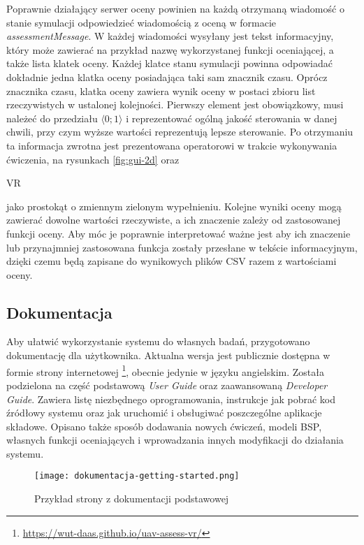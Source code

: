 Poprawnie działający serwer oceny powinien na każdą otrzymaną wiadomość o stanie symulacji odpowiedzieć wiadomością z oceną w formacie \emph{assessmentMessage}. W każdej wiadomości wysyłany jest tekst informacyjny, który może zawierać na przykład nazwę wykorzystanej funkcji oceniającej, a także lista klatek oceny. Każdej klatce stanu symulacji powinna odpowiadać dokładnie jedna klatka oceny posiadająca taki sam znacznik czasu. Oprócz znacznika czasu, klatka oceny zawiera wynik oceny w postaci zbioru list rzeczywistych w ustalonej kolejności. Pierwszy element jest obowiązkowy, musi należeć do przedziału $ \langle 0; 1 \rangle $ i reprezentować ogólną jakość sterowania w danej chwili, przy czym wyższe wartości reprezentują lepsze sterowanie. Po otrzymaniu ta informacja zwrotna jest prezentowana operatorowi w trakcie wykonywania ćwiczenia, na rysunkach \ref{fig:gui-2d} oraz \begin{todo}VR\end{todo} jako prostokąt o zmiennym zielonym wypełnieniu. Kolejne wyniki oceny mogą zawierać dowolne wartości rzeczywiste, a ich znaczenie zależy od zastosowanej funkcji oceny. Aby móc je poprawnie interpretować ważne jest aby ich znaczenie lub przynajmniej zastosowana funkcja zostały przesłane w tekście informacyjnym, dzięki czemu będą zapisane do wynikowych plików CSV razem z wartościami oceny.

\subsection{Dokumentacja}
Aby ułatwić wykorzystanie systemu do własnych badań, przygotowano dokumentację dla użytkownika. Aktualna wersja jest publicznie dostępna w formie strony internetowej \footnote{\url{https://wut-daas.github.io/uav-assess-vr/}}, obecnie jedynie w języku angielskim. Została podzielona na część podstawową \emph{User Guide} oraz zaawansowaną \emph{Developer Guide}. Zawiera listę niezbędnego oprogramowania, instrukcje jak pobrać kod źródłowy systemu oraz jak uruchomić i obsługiwać poszczególne aplikacje składowe. Opisano także sposób dodawania nowych ćwiczeń, modeli BSP, własnych funkcji oceniających i wprowadzania innych modyfikacji do działania systemu.

\begin{figure}[!h]
    \caption{Przykład strony z dokumentacji podstawowej}
    \label{fig:dokumentacja-getting-started}
    \centering \texttt{[image: dokumentacja-getting-started.png]}
\end{figure}

